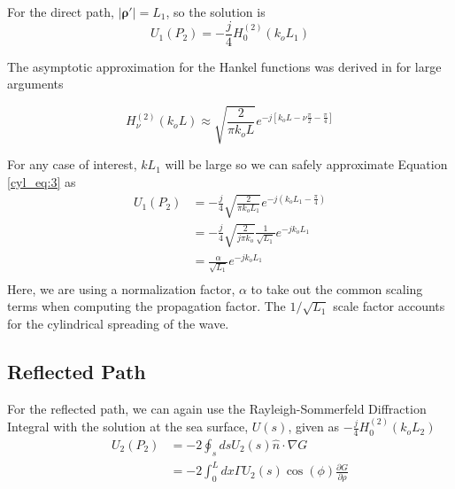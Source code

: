 \noindent For the direct path, $|\boldsymbol{\rho}'| = L_1$, so the  solution is
\begin{equation}
U_1(P_2) =-\frac{j}{4}H_0^{(2)}\left(k_oL_1 \right)
\label{cyl_eq:3}
\end{equation}
\renewcommand{\baselinestretch}{2} \small\normalsize

The asymptotic approximation for the Hankel functions was derived in \cite{frazier_green} for large arguments

\begin{equation}
H_{\nu}^{(2)}(k_oL) \approx \sqrt{\frac{2}{\pi k_o L}}e^{-j\left[k_oL - \nu\frac{\pi}{2} - \frac{\pi}{4}\right]}
\label{cyl_eq:4}
\end{equation}
\renewcommand{\baselinestretch}{2} \small\normalsize

\noindent For any case of interest, $kL_1$ will be large so we can safely approximate Equation \ref{cyl_eq:3} as
\begin{equation}
\begin{aligned}
U_1(P_2) &=-\frac{j}{4}\sqrt{\frac{2}{\pi k_o L_1}}e^{-j(k_oL_1 - \frac{\pi}{4})}\\
&=-\frac{j}{4}\sqrt{\frac{2}{j\pi k_o}}\frac{1}{\sqrt{L_1}}e^{-jk_oL_1 }\\
&=\frac{\alpha}{\sqrt{L_1}}e^{-jk_oL_1 }\\
\label{cyl_eq:5}
\end{aligned}
\end{equation}
\renewcommand{\baselinestretch}{2} \small\normalsize
Here, we are using a normalization factor, $\alpha$ to take out the common scaling terms when computing the propagation factor. The $1/\sqrt{L_1}$ scale factor accounts for the cylindrical spreading of the wave.

\subsection{Reflected Path}
For the reflected path, we can again use the Rayleigh-Sommerfeld Diffraction Integral with the solution at the sea surface, $U(s)$, given as $-\frac{j}{4}H_0^{(2)}\left(k_oL_2 \right)$
\begin{equation}
\begin{aligned}
U_2(P_2) &= -2\oint_s ds U_2(s)\hat{n}\cdot\nabla G\\
&= -2\int_0^L dx \Gamma U_2(s)\cos(\phi)\frac{\partial G}{\partial \rho}\\
\end{aligned}
\label{cyl_eq:6}
\end{equation}

